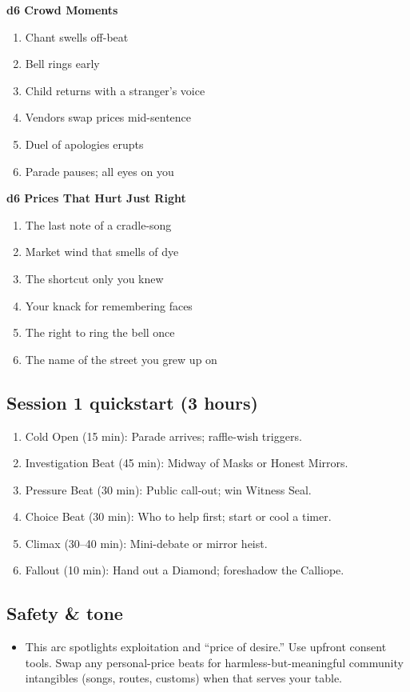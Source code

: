 \documentclass[11pt]{article}
\newcommand{\divider}{\vspace{12pt}\noindent\makebox[\linewidth]{\rule{\textwidth}{0.4pt}}\vspace{12pt}}
\begin{document}
\textbf{d6 Crowd Moments}
\begin{enumerate}
\item Chant swells off-beat
\item Bell rings early
\item Child returns with a stranger's voice
\item Vendors swap prices mid-sentence
\item Duel of apologies erupts
\item Parade pauses; all eyes on you
\end{enumerate}

\textbf{d6 Prices That Hurt Just Right}
\begin{enumerate}
\item The last note of a cradle-song
\item Market wind that smells of dye
\item The shortcut only you knew
\item Your knack for remembering faces
\item The right to ring the bell once
\item The name of the street you grew up on
\end{enumerate}

\divider

\subsection*{Session 1 quickstart (3 hours)}
\begin{enumerate}
\item Cold Open (15 min): Parade arrives; raffle-wish triggers.
\item Investigation Beat (45 min): Midway of Masks or Honest Mirrors.
\item Pressure Beat (30 min): Public call-out; win Witness Seal.
\item Choice Beat (30 min): Who to help first; start or cool a timer.
\item Climax (30--40 min): Mini-debate or mirror heist.
\item Fallout (10 min): Hand out a Diamond; foreshadow the Calliope.
\end{enumerate}

\divider

\subsection*{Safety \& tone}
\begin{itemize}
\item This arc spotlights exploitation and ``price of desire.'' Use upfront consent tools. Swap any personal-price beats for harmless-but-meaningful community intangibles (songs, routes, customs) when that serves your table.
\end{itemize}
\end{document}
